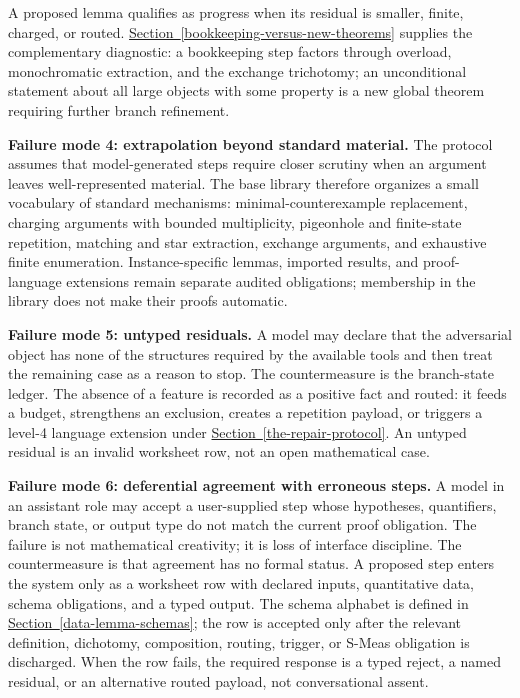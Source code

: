 \documentclass[
  11pt,
]{article}
\theoremstyle{definition}
\newcommand{\secref}[1]{\hyperref[#1]{Section~\ref*{#1}}}
\begin{document}
A proposed lemma qualifies as progress when its residual is smaller,
finite, charged, or routed. \secref{bookkeeping-versus-new-theorems} supplies the complementary
diagnostic: a bookkeeping step factors through overload, monochromatic
extraction, and the exchange trichotomy; an unconditional statement
about all large objects with some property is a new global theorem
requiring further branch refinement.

\textbf{Failure mode 4: extrapolation beyond standard material.}
The protocol assumes that model-generated steps require closer scrutiny
when an argument leaves well-represented material. The base library
therefore organizes a small vocabulary of standard mechanisms:
minimal-counterexample replacement, charging
arguments with bounded multiplicity, pigeonhole and finite-state
repetition, matching and star extraction, exchange arguments, and
exhaustive finite enumeration. Instance-specific lemmas, imported
results, and proof-language extensions remain separate audited
obligations; membership in the library does not make their proofs
automatic.

\textbf{Failure mode 5: untyped residuals.} A model may declare that
the adversarial object has none of the structures required by the
available tools and then treat the remaining case as a reason to stop.
The countermeasure is the branch-state ledger. The absence of a feature
is recorded as a positive fact and routed: it feeds a budget, strengthens
an exclusion, creates a repetition payload, or triggers a level-4
language extension under \secref{the-repair-protocol}. An untyped residual is an invalid
worksheet row, not an open mathematical case.

\textbf{Failure mode 6: deferential agreement with erroneous steps.} A
model in an assistant role may accept a user-supplied step whose
hypotheses, quantifiers, branch state, or output type do not match the
current proof obligation. The failure is not mathematical creativity; it
is loss of interface discipline. The countermeasure is that agreement
has no formal status. A proposed step enters the system only as a
worksheet row with declared inputs, quantitative data, schema
obligations, and a typed output. The schema alphabet is defined in
\secref{data-lemma-schemas}; the row is accepted only after the relevant
definition, dichotomy, composition, routing, trigger, or S-Meas obligation is
discharged. When the row fails, the required response is a typed reject,
a named residual, or an alternative routed payload, not conversational
assent.
\end{document}
